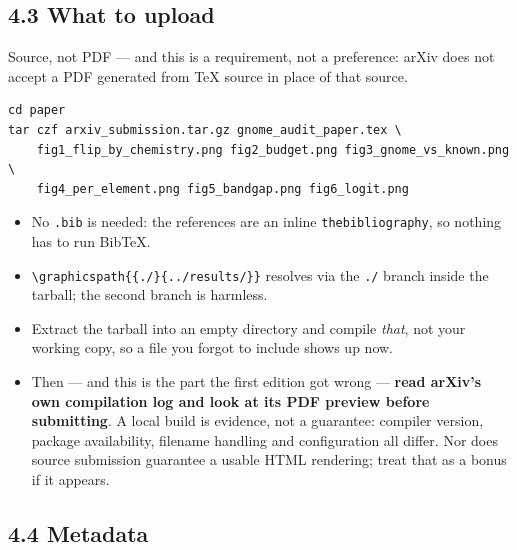 \documentclass[11pt]{article}
\begin{document}
\subsection*{4.3 What to upload}

Source, not PDF --- and this is a requirement, not a preference: arXiv does not accept a PDF
generated from TeX source in place of that source.

\begin{Verbatim}[fontsize=\small,frame=single]
cd paper
tar czf arxiv_submission.tar.gz gnome_audit_paper.tex \
    fig1_flip_by_chemistry.png fig2_budget.png fig3_gnome_vs_known.png \
    fig4_per_element.png fig5_bandgap.png fig6_logit.png
\end{Verbatim}

\begin{itemize}[nosep]
\item No \texttt{.bib} is needed: the references are an inline \texttt{thebibliography}, so
      nothing has to run BibTeX.
\item \texttt{\textbackslash graphicspath\{\{./\}\{../results/\}\}} resolves via the
      \texttt{./} branch inside the tarball; the second branch is harmless.
\item Extract the tarball into an empty directory and compile \emph{that}, not your working
      copy, so a file you forgot to include shows up now.
\item Then --- and this is the part the first edition got wrong --- \textbf{read arXiv's own
      compilation log and look at its PDF preview before submitting}. A local build is
      evidence, not a guarantee: compiler version, package availability, filename handling
      and configuration all differ. Nor does source submission guarantee a usable HTML
      rendering; treat that as a bonus if it appears.
\end{itemize}

\subsection*{4.4 Metadata}
\end{document}
